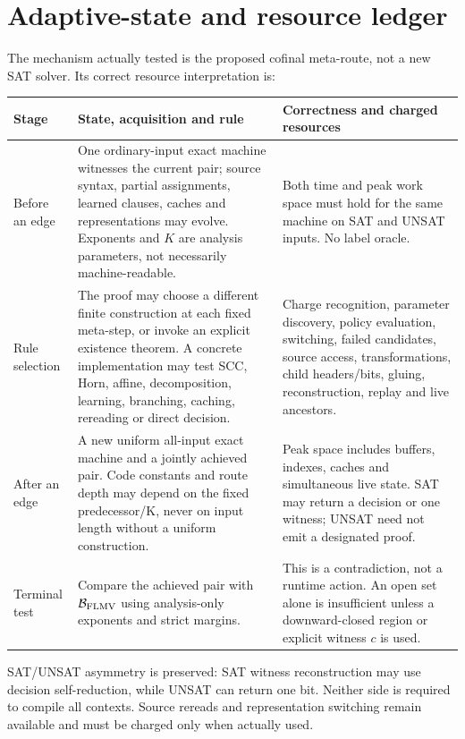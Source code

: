 \documentclass[11pt]{article}
\newcommand{\BB}{\mathcal B_{\rm FLMV}}
\begin{document}
\section{Adaptive-state and resource ledger}

The mechanism actually tested is the proposed cofinal meta-route, not a new
SAT solver.  Its correct resource interpretation is:

\begin{center}\small
\begin{tabularx}{\linewidth}{p{.18\linewidth}X p{.26\linewidth}}
\toprule
Stage & State, acquisition and rule & Correctness and charged resources\\\midrule
Before an edge & One ordinary-input exact machine witnesses the current pair; source syntax, partial assignments, learned clauses, caches and representations may evolve.  Exponents and $K$ are analysis parameters, not necessarily machine-readable. & Both time and peak work space must hold for the same machine on SAT and UNSAT inputs. No label oracle.\\
Rule selection & The proof may choose a different finite construction at each fixed meta-step, or invoke an explicit existence theorem.  A concrete implementation may test SCC, Horn, affine, decomposition, learning, branching, caching, rereading or direct decision. & Charge recognition, parameter discovery, policy evaluation, switching, failed candidates, source access, transformations, child headers/bits, gluing, reconstruction, replay and live ancestors.\\
After an edge & A new uniform all-input exact machine and a jointly achieved pair.  Code constants and route depth may depend on the fixed predecessor/K, never on input length without a uniform construction. & Peak space includes buffers, indexes, caches and simultaneous live state.  SAT may return a decision or one witness; UNSAT need not emit a designated proof.\\
Terminal test & Compare the achieved pair with $\BB$ using analysis-only exponents and strict margins. & This is a contradiction, not a runtime action.  An open set alone is insufficient unless a downward-closed region or explicit witness $c$ is used.\\
\bottomrule
\end{tabularx}
\end{center}

SAT/UNSAT asymmetry is preserved: SAT witness reconstruction may use decision
self-reduction, while UNSAT can return one bit.  Neither side is required to
compile all contexts.  Source rereads and representation switching remain
available and must be charged only when actually used.
\end{document}
